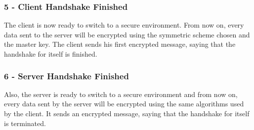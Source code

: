 \subsubsection{5 - Client Handshake Finished}
\par
The client is now ready to switch to a secure environment. From now on, every data sent to the server will be encrypted using the symmetric scheme chosen and the master key. The client sends his first encrypted message, saying that the handshake for itself is finished.

\subsubsection{6 - Server Handshake Finished}
\par
Also, the server is ready to switch to a secure environment and from now on, every data sent by the server will be encrypted using the same algorithms used by the client. It sends an encrypted message, saying that the handshake for itself is terminated.
